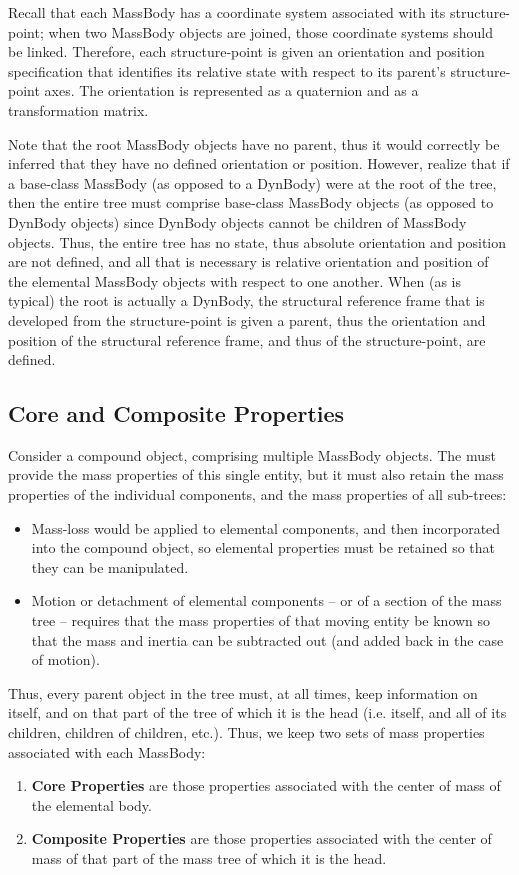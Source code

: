Recall that each MassBody has a coordinate system associated with its 
structure-point; when two MassBody objects are joined, those coordinate 
systems should be linked.  Therefore, each 
structure-point is given an orientation and position 
specification that identifies its relative state with respect to its parent's 
structure-point axes.  The orientation is represented as a quaternion and as a 
transformation matrix.

Note that the root MassBody objects have no parent, thus it would correctly be 
inferred that they have no defined orientation or position.  However, realize 
that if a base-class 
MassBody (as opposed to a DynBody) were at the root of the tree, then the 
entire tree 
must comprise base-class MassBody objects 
(as opposed to DynBody objects) since DynBody 
objects cannot be children of MassBody objects.  Thus, the entire tree has 
no state, thus absolute orientation and position are not defined, and all that 
is necessary 
is relative orientation and position of the elemental MassBody objects with 
respect to one 
another.  When (as is typical) the root is actually a DynBody, the structural 
reference frame that is developed from the structure-point is given a parent, 
thus the orientation and position of the structural reference frame, and thus 
of the structure-point, are defined.

\subsection{Core and Composite Properties}\label{sec:core_comp_prop}
Consider a compound object, comprising multiple MassBody objects.  The 
\ModelDesc must provide the mass properties of this single entity, but it must 
also retain the mass properties of the individual components, and the mass 
properties of all sub-trees:
\begin{itemize}
 \item Mass-loss would be applied to elemental components, and then 
 incorporated 
 into the compound object, so elemental properties must be retained so that 
 they can be manipulated.
 \item Motion or detachment of elemental components -- or of a section of the 
 mass tree -- 
 requires that the mass properties of that moving entity be known so that 
 the mass and inertia can be subtracted out (and added back in the case of 
 motion).
\end{itemize}
Thus, every parent object in the tree must, at all times, keep information on 
itself, and on that part of the tree of which it is the head (i.e. itself, and 
all of its children, children of children, etc.).  Thus, we keep two sets of 
mass properties associated with each MassBody:
\begin{enumerate}
 \item \textbf{Core Properties} are those properties associated with the 
 center of mass of the elemental body.
 \item \textbf{Composite Properties} are those properties associated with the 
 center of mass of that part of the mass tree of which it is the head.
\end{enumerate}

